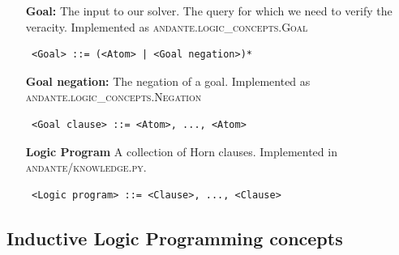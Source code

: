 \documentclass{article}
\begin{document}
\begin{itemize}
    \item[\textbf{Goal:}] The input to our solver. The query for which we need
        to verify the veracity. Implemented as
        \textsc{andante.logic\_concepts.Goal} 
        \begin{verbatim} <Goal> ::= (<Atom> | <Goal negation>)* \end{verbatim}

    \item[\textbf{Goal negation:}] The negation of a goal. Implemented as
        \textsc{andante.logic\_concepts.Negation} 
        \begin{verbatim} <Goal clause> ::= <Atom>, ..., <Atom> \end{verbatim}

    \item[\textbf{Logic Program}] A collection of Horn clauses. Implemented in
        \textsc{andante/knowledge.py}.  
        \begin{verbatim} <Logic program> ::= <Clause>, ..., <Clause> \end{verbatim}
\end{itemize}

\subsection{Inductive Logic Programming concepts} \label{terminology:ilpconcepts}
\end{document}
